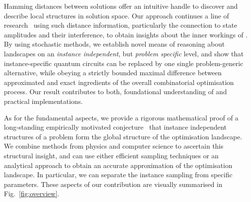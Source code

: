 Hamming distances between solutions offer an intuitive handle to discover and describe local structures in solution space. Our approach continues
a line of research~\cite{montanez2024towards,diez2024connection,
streif2019comparison,bravyi2020obstacles} using such distance information, particularly the connection to state amplitudes and their interference,
to obtain insights about the inner workings of \QAOA. By using stochastic 
methods, we establish novel means of reasoning about \QAOA landscapes on an \emph{instance 
independent}, but \emph{problem specific} level, and show that 
instance-specific quantum circuits can be replaced by one single 
problem-generic alternative, while obeying a strictly bounded  
maximal difference between approximated and exact ingredients of
the overall combinatorial optimisation process.
% 
Our result contributes to both, foundational understanding
of \QAOA and practical implementations.

As for the fundamental aspects, we provide a rigorous mathematical proof of a long-standing empirically motivated conjecture~\cite{brandao2018fixed,streif2020training,sack2021quantum,galda2similarity,Sud:2024} that instance independent structures of a problem form the global structure of the \QAOA optimisation landscape. We combine methods from physics and computer science to ascertain this structural insight, and can use either efficient sampling techniques or an analytical approach to obtain an accurate approximation of the \QAOA optimisation landscape. In particular, we can separate the instance sampling from specific \QAOA parameters. These aspects of our contribution are visually summarised in Fig.~\ref{fig:overview}.
\newbox\varbox\newbox\databox
\setbox\varbox\hbox{}
\setbox\databox\hbox{}

